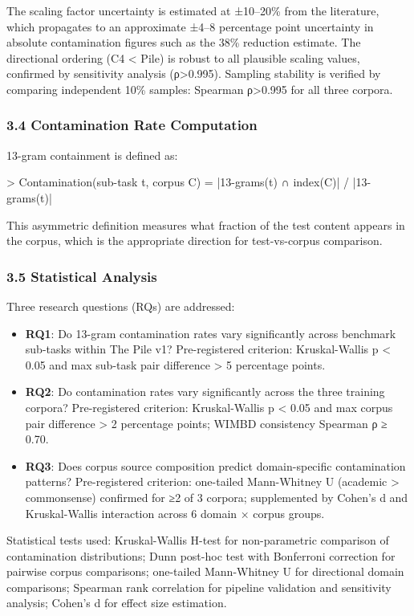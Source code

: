 The scaling factor uncertainty is estimated at ±10–20\% from the literature, which propagates to an approximate ±4–8 percentage point uncertainty in absolute contamination figures such as the 38\% reduction estimate. The directional ordering (C4 < Pile) is robust to all plausible scaling values, confirmed by sensitivity analysis (ρ>0.995). Sampling stability is verified by comparing independent 10\% samples: Spearman ρ>0.995 for all three corpora.

\subsubsection{3.4 Contamination Rate Computation}

13-gram containment is defined as:

> Contamination(sub-task t, corpus C) = |{13-grams(t) ∩ index(C)}| / |{13-grams(t)}|

This asymmetric definition measures what fraction of the test content appears in the corpus, which is the appropriate direction for test-vs-corpus comparison.

\subsubsection{3.5 Statistical Analysis}

Three research questions (RQs) are addressed:

\begin{itemize}
\item \textbf{RQ1}: Do 13-gram contamination rates vary significantly across benchmark sub-tasks within The Pile v1? Pre-registered criterion: Kruskal-Wallis p < 0.05 and max sub-task pair difference > 5 percentage points.
\item \textbf{RQ2}: Do contamination rates vary significantly across the three training corpora? Pre-registered criterion: Kruskal-Wallis p < 0.05 and max corpus pair difference > 2 percentage points; WIMBD consistency Spearman ρ ≥ 0.70.
\item \textbf{RQ3}: Does corpus source composition predict domain-specific contamination patterns? Pre-registered criterion: one-tailed Mann-Whitney U (academic > commonsense) confirmed for ≥2 of 3 corpora; supplemented by Cohen's d and Kruskal-Wallis interaction across 6 domain × corpus groups.
\end{itemize}

Statistical tests used: Kruskal-Wallis H-test for non-parametric comparison of contamination distributions; Dunn post-hoc test with Bonferroni correction for pairwise corpus comparisons; one-tailed Mann-Whitney U for directional domain comparisons; Spearman rank correlation for pipeline validation and sensitivity analysis; Cohen's d for effect size estimation.

